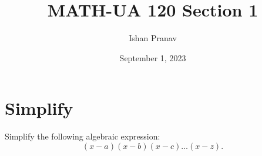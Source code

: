 \documentclass[12pt]{article}
\title{MATH-UA 120 Section 1}
\author{Ishan Pranav}
\date{September 1, 2023}
\begin{document}
\maketitle
\section*{Simplify}
Simplify the following algebraic expression:
\[(x-a)(x-b)(x-c)\dots(x-z).\]
\end{document}
